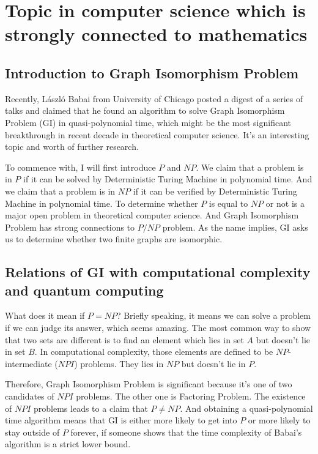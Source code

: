 \documentclass[12pt]{article}
\begin{document}
\bigskip

\section{Topic in computer science which is strongly connected to mathematics}
\subsection{Introduction to Graph Isomorphism Problem}
Recently, L\'{a}szl\'{o} Babai\cite{babai} from University of Chicago posted a digest of a series of talks and claimed that he found an algorithm to solve Graph Isomorphism Problem (GI) in quasi-polynomial time, which might be the most significant breakthrough in recent decade in theoretical computer science. It’s an interesting topic and worth of further research.

To commence with, I will first introduce $P$ and $NP$. We claim that a problem is in $P$ if it can be solved by Deterministic Turing Machine in polynomial time. And we claim that a problem is in $NP$ if it can be verified by Deterministic Turing Machine in polynomial time. To determine whether $P$ is equal to $NP$ or not is a major open problem in theoretical computer science. And Graph Isomorphism Problem has strong connections to $P/NP$ problem. As the name implies, GI asks us to determine whether two finite graphs are isomorphic.

\bigskip

\subsection{Relations of GI with computational complexity and quantum computing}
What does it mean if $P=NP$? Briefly speaking, it means we can solve a problem if we can judge its answer, which seems amazing. The most common way to show that two sets are different is to find an element which lies in set $A$ but doesn’t lie in set $B$. In computational complexity, those elements are defined to be $NP$-intermediate ($NPI$) problems. They lies in $NP$ but doesn’t lie in $P$. 

Therefore, Graph Isomorphism Problem is significant because it’s one of two candidates of $NPI$ problems. The other one is Factoring Problem. The existence of $NPI$ problems leads to a claim that $P\ne NP$. And obtaining a quasi-polynomial time algorithm means that GI is either more likely to get into $P$ or more likely to stay outside of $P$ forever, if someone shows that the time complexity of Babai’s algorithm is a strict lower bound. 
\end{document}
